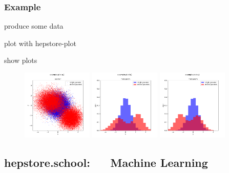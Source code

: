 \documentclass[aps,prd,11pt,tightenlines,superscriptaddress,nofootinbib,preprintnumbers,notitlepage]{revtex4-1}
\begin{document}
\subsubsection{Example}
produce some data
%
\begin{changemargin}{1.5cm}{1.5cm} 
  
\end{changemargin}
%
plot with hepstore-plot
%
\begin{changemargin}{1.5cm}{1.5cm} 
  
\end{changemargin}
%
%
show plots
%
\begin{figure}
  \centering
  \includegraphics[width=0.3\textwidth]{../examples/hepstore_plot/example_a.pdf}
  \includegraphics[width=0.3\textwidth]{../examples/hepstore_plot/example_b.pdf}
  \includegraphics[width=0.3\textwidth]{../examples/hepstore_plot/example_c.pdf}
  \caption{}
  \label{fig:example_plotting}
\end{figure}
%


\subsection{hepstore.school:~~~\,Machine Learning}
\end{document}
